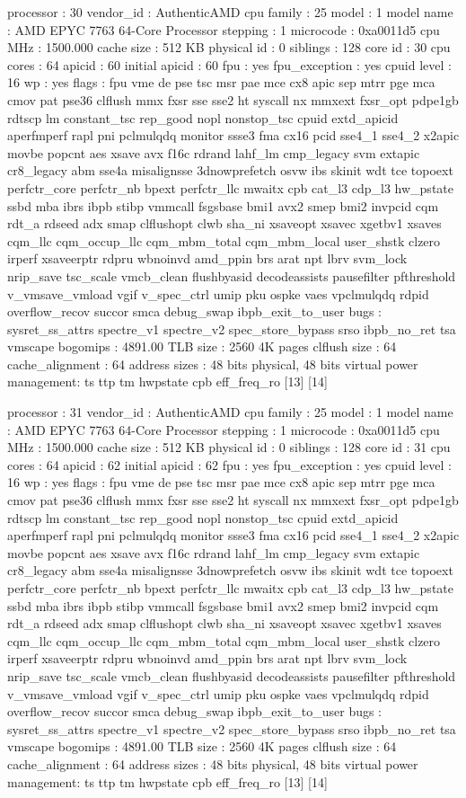 processor	: 30
vendor_id	: AuthenticAMD
cpu family	: 25
model		: 1
model name	: AMD EPYC 7763 64-Core Processor
stepping	: 1
microcode	: 0xa0011d5
cpu MHz		: 1500.000
cache size	: 512 KB
physical id	: 0
siblings	: 128
core id		: 30
cpu cores	: 64
apicid		: 60
initial apicid	: 60
fpu		: yes
fpu_exception	: yes
cpuid level	: 16
wp		: yes
flags		: fpu vme de pse tsc msr pae mce cx8 apic sep mtrr pge mca cmov pat pse36 clflush mmx fxsr sse sse2 ht syscall nx mmxext fxsr_opt pdpe1gb rdtscp lm constant_tsc rep_good nopl nonstop_tsc cpuid extd_apicid aperfmperf rapl pni pclmulqdq monitor ssse3 fma cx16 pcid sse4_1 sse4_2 x2apic movbe popcnt aes xsave avx f16c rdrand lahf_lm cmp_legacy svm extapic cr8_legacy abm sse4a misalignsse 3dnowprefetch osvw ibs skinit wdt tce topoext perfctr_core perfctr_nb bpext perfctr_llc mwaitx cpb cat_l3 cdp_l3 hw_pstate ssbd mba ibrs ibpb stibp vmmcall fsgsbase bmi1 avx2 smep bmi2 invpcid cqm rdt_a rdseed adx smap clflushopt clwb sha_ni xsaveopt xsavec xgetbv1 xsaves cqm_llc cqm_occup_llc cqm_mbm_total cqm_mbm_local user_shstk clzero irperf xsaveerptr rdpru wbnoinvd amd_ppin brs arat npt lbrv svm_lock nrip_save tsc_scale vmcb_clean flushbyasid decodeassists pausefilter pfthreshold v_vmsave_vmload vgif v_spec_ctrl umip pku ospke vaes vpclmulqdq rdpid overflow_recov succor smca debug_swap ibpb_exit_to_user
bugs		: sysret_ss_attrs spectre_v1 spectre_v2 spec_store_bypass srso ibpb_no_ret tsa vmscape
bogomips	: 4891.00
TLB size	: 2560 4K pages
clflush size	: 64
cache_alignment	: 64
address sizes	: 48 bits physical, 48 bits virtual
power management: ts ttp tm hwpstate cpb eff_freq_ro [13] [14]

processor	: 31
vendor_id	: AuthenticAMD
cpu family	: 25
model		: 1
model name	: AMD EPYC 7763 64-Core Processor
stepping	: 1
microcode	: 0xa0011d5
cpu MHz		: 1500.000
cache size	: 512 KB
physical id	: 0
siblings	: 128
core id		: 31
cpu cores	: 64
apicid		: 62
initial apicid	: 62
fpu		: yes
fpu_exception	: yes
cpuid level	: 16
wp		: yes
flags		: fpu vme de pse tsc msr pae mce cx8 apic sep mtrr pge mca cmov pat pse36 clflush mmx fxsr sse sse2 ht syscall nx mmxext fxsr_opt pdpe1gb rdtscp lm constant_tsc rep_good nopl nonstop_tsc cpuid extd_apicid aperfmperf rapl pni pclmulqdq monitor ssse3 fma cx16 pcid sse4_1 sse4_2 x2apic movbe popcnt aes xsave avx f16c rdrand lahf_lm cmp_legacy svm extapic cr8_legacy abm sse4a misalignsse 3dnowprefetch osvw ibs skinit wdt tce topoext perfctr_core perfctr_nb bpext perfctr_llc mwaitx cpb cat_l3 cdp_l3 hw_pstate ssbd mba ibrs ibpb stibp vmmcall fsgsbase bmi1 avx2 smep bmi2 invpcid cqm rdt_a rdseed adx smap clflushopt clwb sha_ni xsaveopt xsavec xgetbv1 xsaves cqm_llc cqm_occup_llc cqm_mbm_total cqm_mbm_local user_shstk clzero irperf xsaveerptr rdpru wbnoinvd amd_ppin brs arat npt lbrv svm_lock nrip_save tsc_scale vmcb_clean flushbyasid decodeassists pausefilter pfthreshold v_vmsave_vmload vgif v_spec_ctrl umip pku ospke vaes vpclmulqdq rdpid overflow_recov succor smca debug_swap ibpb_exit_to_user
bugs		: sysret_ss_attrs spectre_v1 spectre_v2 spec_store_bypass srso ibpb_no_ret tsa vmscape
bogomips	: 4891.00
TLB size	: 2560 4K pages
clflush size	: 64
cache_alignment	: 64
address sizes	: 48 bits physical, 48 bits virtual
power management: ts ttp tm hwpstate cpb eff_freq_ro [13] [14]


